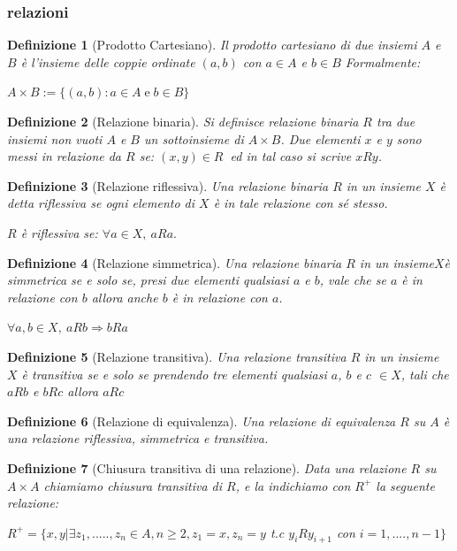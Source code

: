 \documentclass[a4paper]{article}
\newtheorem*{definition}{Definizione}
\begin{document}
\subsubsection{relazioni}
\begin{definition}[Prodotto Cartesiano]Il prodotto cartesiano di due insiemi $A$ e $B$ è l'insieme delle coppie ordinate $(a,b)$ con $a \in A$ e $b \in B$ Formalmente:\begin{center}
$A\times B:=\{(a,b):a\in A\;{\mathrm  {e}}\;b\in B\}$\end{center}
\end{definition}
\begin{definition}[Relazione binaria]
Si definisce relazione binaria $R$ tra due insiemi non vuoti $A$ e $B$ un sottoinsieme di $ A \times B$. Due elementi $x$ e $y$ sono messi in relazione da $R$ se: 
$(x,y)\in R\ $ ed in tal caso si scrive $xRy$.
\end{definition}
\begin{definition}[Relazione riflessiva]
Una relazione binaria $R$ in un insieme $X$ è detta riflessiva se ogni elemento di $X$ è in tale relazione con sé stesso.
\begin{center} $R$ è riflessiva se: $ \forall a\in X,\ aRa.$ \end{center}
\end{definition}
\begin{definition}[Relazione simmetrica]Una relazione binaria $R$ in un insieme$ X $è simmetrica se e solo se, presi due elementi qualsiasi $a$ e $b$, vale che se $a$ è in relazione con $b$ allora anche $b$ è in relazione con $a$.\\
\begin{center}$\forall a,b\in X,\ aRb\Rightarrow bRa$\end{center}
\end{definition}
\begin{definition}[Relazione transitiva]Una relazione transitiva $R$ in un insieme $X$ è transitiva se e solo se prendendo tre elementi qualsiasi $a$, $b$ e $c$ $ \in X$, tali che $aRb$ e $bRc$ allora $aRc$
\end{definition}
\begin{definition}[Relazione di equivalenza]Una relazione di equivalenza $R$ su $A$ è una relazione riflessiva, simmetrica e transitiva.
\end{definition}
\begin{definition}[Chiusura transitiva di una relazione]Data una relazione $R$ su $A\times A$ chiamiamo chiusura transitiva di $R$, e la indichiamo con $R^{+}$ la seguente relazione:
\begin{center}$ R^{+} = \{ x, y | \exists z_1,.....,z_n \in A, n \geq 2, z_1 = x, z_n = y$ t.c $ y_iRy_{i+1}$ con $ i=1,....,n-1 \} $ \end{center}
\end{definition}
\end{document}
